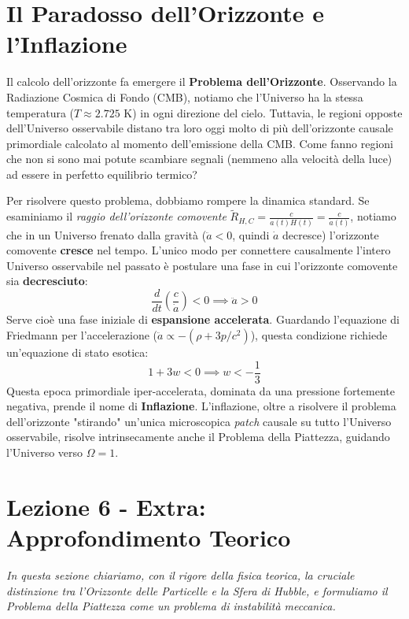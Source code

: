 \documentclass[11pt,a4paper]{report}
\begin{document}
\section{Il Paradosso dell'Orizzonte e l'Inflazione}

Il calcolo dell'orizzonte fa emergere il \textbf{Problema dell'Orizzonte}. Osservando la Radiazione Cosmica di Fondo (CMB), notiamo che l'Universo ha la stessa temperatura ($T \approx 2.725$ K) in ogni direzione del cielo. Tuttavia, le regioni opposte dell'Universo osservabile distano tra loro oggi molto di più dell'orizzonte causale primordiale calcolato al momento dell'emissione della CMB. Come fanno regioni che non si sono mai potute scambiare segnali (nemmeno alla velocità della luce) ad essere in perfetto equilibrio termico?

Per risolvere questo problema, dobbiamo rompere la dinamica standard. Se esaminiamo il \textit{raggio dell'orizzonte comovente} $\tilde{R}_{H,C} = \frac{c}{a(t)H(t)} = \frac{c}{\dot{a}(t)}$, notiamo che in un Universo frenato dalla gravità ($\ddot{a} < 0$, quindi $\dot{a}$ decresce) l'orizzonte comovente \textbf{cresce} nel tempo.
L'unico modo per connettere causalmente l'intero Universo osservabile nel passato è postulare una fase in cui l'orizzonte comovente sia \textbf{decresciuto}:
\begin{equation}
\frac{d}{dt} \left( \frac{c}{\dot{a}} \right) < 0 \implies \ddot{a} > 0
\end{equation}
Serve cioè una fase iniziale di \textbf{espansione accelerata}. Guardando l'equazione di Friedmann per l'accelerazione ($\ddot{a} \propto -(\rho + 3p/c^2)$), questa condizione richiede un'equazione di stato esotica:
\begin{equation}
1 + 3w < 0 \implies w < -\frac{1}{3}
\end{equation}
Questa epoca primordiale iper-accelerata, dominata da una pressione fortemente negativa, prende il nome di \textbf{Inflazione}. L'inflazione, oltre a risolvere il problema dell'orizzonte "stirando" un'unica microscopica \textit{patch} causale su tutto l'Universo osservabile, risolve intrinsecamente anche il Problema della Piattezza, guidando l'Universo verso $\Omega=1$.

\newpage
\section{Lezione 6 - Extra: Approfondimento Teorico}

\textit{In questa sezione chiariamo, con il rigore della fisica teorica, la cruciale distinzione tra l'Orizzonte delle Particelle e la Sfera di Hubble, e formuliamo il Problema della Piattezza come un problema di instabilità meccanica.}
\end{document}
